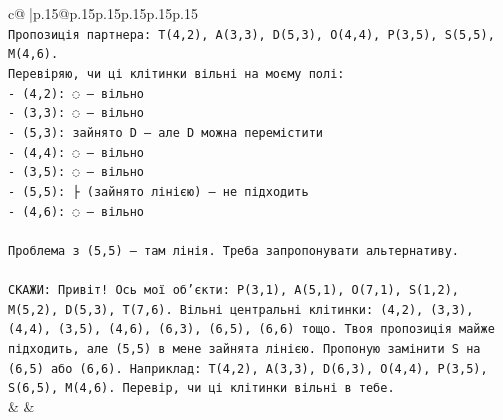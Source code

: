 \documentclass{article}
\begin{document}
{\begin{supertabular}{c@{$\;$}|p{.15\linewidth}@{}p{.15\linewidth}p{.15\linewidth}p{.15\linewidth}p{.15\linewidth}p{.15\linewidth}}
{{{\\ 
\texttt{Пропозиція партнера: T(4,2), A(3,3), D(5,3), O(4,4), P(3,5), S(5,5), M(4,6). } \\
\texttt{Перевіряю, чи ці клітинки вільні на моєму полі:} \\
\texttt{{-} (4,2): ◌ — вільно} \\
\texttt{{-} (3,3): ◌ — вільно} \\
\texttt{{-} (5,3): зайнято D — але D можна перемістити} \\
\texttt{{-} (4,4): ◌ — вільно} \\
\texttt{{-} (3,5): ◌ — вільно} \\
\texttt{{-} (5,5): ├ (зайнято лінією) — не підходить} \\
\texttt{{-} (4,6): ◌ — вільно} \\
\\ 
\texttt{Проблема з (5,5) — там лінія. Треба запропонувати альтернативу.} \\
\\ 
\texttt{СКАЖИ: Привіт! Ось мої об'єкти: P(3,1), A(5,1), O(7,1), S(1,2), M(5,2), D(5,3), T(7,6). Вільні центральні клітинки: (4,2), (3,3), (4,4), (3,5), (4,6), (6,3), (6,5), (6,6) тощо. Твоя пропозиція майже підходить, але (5,5) в мене зайнята лінією. Пропоную замінити S на (6,5) або (6,6). Наприклад: T(4,2), A(3,3), D(6,3), O(4,4), P(3,5), S(6,5), M(4,6). Перевір, чи ці клітинки вільні в тебе.} \\
            }
        }
    }
    & & \\ \\


\end{supertabular}}
\end{document}
